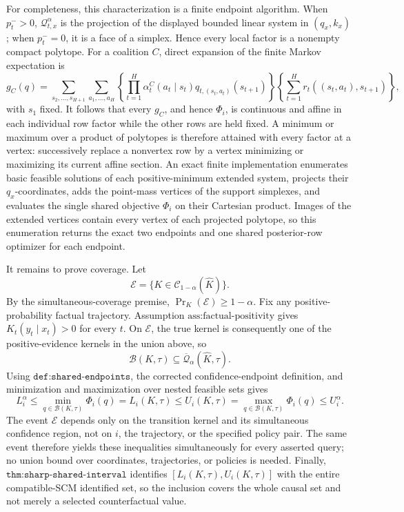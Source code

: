 For completeness, this characterization is a finite endpoint algorithm.
When \(p_t^->0\), \(\mathcal Q_{t,x}^{\alpha}\) is the projection of the
displayed bounded linear system in \((q_x,k_x)\); when \(p_t^-=0\), it is a
face of a simplex.  Hence every local factor is a nonempty compact polytope.
For a coalition \(C\), direct expansion of the finite Markov expectation is
\[
 g_C(q)=
 \sum_{s_2,\ldots,s_{H+1}}\sum_{a_1,\ldots,a_H}
 \left\{\prod_{t=1}^H
   \alpha_t^C(a_t\mid s_t)
   q_{t,(s_t,a_t)}(s_{t+1})\right\}
 \left\{\sum_{t=1}^H r_t((s_t,a_t),s_{t+1})\right\},
\]
with \(s_1\) fixed.  It follows that every \(g_C\), and hence
\(\Phi_i\), is continuous and affine in each individual row factor while
the other rows are held fixed.  A minimum or maximum over a product of
polytopes is therefore attained with every factor at a vertex: successively
replace a nonvertex row by a vertex minimizing or maximizing its current
affine section.  An exact finite implementation enumerates basic feasible
solutions of each positive-minimum extended system, projects their
\(q_x\)-coordinates, adds the point-mass vertices of the support simplexes,
and evaluates the single shared objective \(\Phi_i\) on their Cartesian
product.  Images of the extended vertices contain every vertex of each
projected polytope, so this enumeration returns the exact two endpoints and
one shared posterior-row optimizer for each endpoint.

It remains to prove coverage.  Let
\[
 \mathcal E=\{K\in\mathcal C_{1-\alpha}(\widehat K)\}.
\]
By the simultaneous-coverage premise,
\(\Pr_K(\mathcal E)\ge1-\alpha\).  Fix any positive-probability factual
trajectory.  Assumption \(\text{ass:factual-positivity}\) gives
\(K_t(y_t\mid x_t)>0\) for every \(t\).  On \(\mathcal E\), the true kernel
is consequently one of the positive-evidence kernels in the union above, so
\[
 \mathcal B(K,\tau)
 \subseteq\overline{\mathcal Q}_{\alpha}(\widehat K,\tau).
\]
Using \(\texttt{def:shared-endpoints}\), the corrected confidence-endpoint
definition, and minimization and maximization over nested feasible sets gives
\[
 L_i^{\alpha}
 \le \min_{q\in\mathcal B(K,\tau)}\Phi_i(q)
 =L_i(K,\tau)
 \le U_i(K,\tau)
 =\max_{q\in\mathcal B(K,\tau)}\Phi_i(q)
 \le U_i^{\alpha}.
\]
The event \(\mathcal E\) depends only on the transition kernel and its
simultaneous confidence region, not on \(i\), the trajectory, or the specified
policy pair.  The same event therefore yields these inequalities
simultaneously for every asserted query; no union bound over coordinates,
trajectories, or policies is needed.  Finally,
\(\texttt{thm:sharp-shared-interval}\) identifies
\([L_i(K,\tau),U_i(K,\tau)]\) with the entire compatible-SCM identified set,
so the inclusion covers the whole causal set and not merely a selected
counterfactual value.